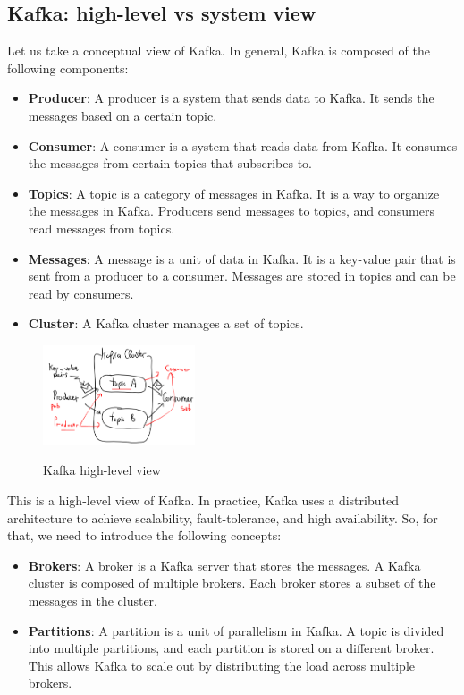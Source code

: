 \subsection{Kafka: high-level vs system view}

Let us take a conceptual view of Kafka. In general, Kafka is composed of the following components:

\begin{itemize}
    \item \textbf{Producer}: A producer is a system that sends data to Kafka. It sends the messages
    based on a certain topic.

    \item \textbf{Consumer}: A consumer is a system that reads data from Kafka. It consumes the messages
    from certain topics that subscribes to.

    \item \textbf{Topics}: A topic is a category of messages in Kafka. It is a way to organize the messages
    in Kafka. Producers send messages to topics, and consumers read messages from topics.

    \item \textbf{Messages}: A message is a unit of data in Kafka. It is a key-value pair that is sent 
    from a producer to a consumer. Messages are stored in topics and can be read by consumers.

    \item \textbf{Cluster}: A Kafka cluster manages a set of topics. 
\end{itemize}

\begin{figure}[H]
    \centering
    \includegraphics[width=0.4\textwidth]{figures/kafka_high_lev.png}
    \label{fig:kafka_high_lev}
    \caption{Kafka high-level view}
\end{figure}

This is a high-level view of Kafka. In practice, Kafka uses a distributed architecture to achieve
scalability, fault-tolerance, and high availability. So, for that, we need to introduce the
following concepts:

\begin{itemize}
    \item \textbf{Brokers}: A broker is a Kafka server that stores the messages. A Kafka cluster is composed
    of multiple brokers. Each broker stores a subset of the messages in the cluster.

    \item \textbf{Partitions}: A partition is a unit of parallelism in Kafka. A topic is divided into multiple
    partitions, and each partition is stored on a different broker. This allows Kafka to scale out by distributing
    the load across multiple brokers.
\end{itemize}

